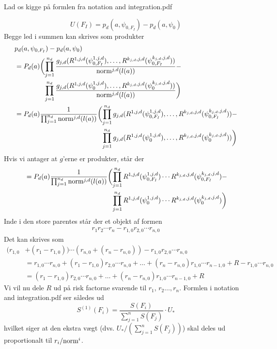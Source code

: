 \documentclass[a4paper, 12pt]{memoir}
\begin{document}
Lad os kigge på formlen fra notation and integration.pdf

\begin{equation}
U(F_I)=p_d(a,\psi_{0,F_I})-p_d(a, \psi_0)
\end{equation}
Begge led i summen kan skrives som produkter
\begin{align}
&p_d(a,\psi_{0,F_I})-p_d(a, \psi_0)\\
&=P_d(a) \biggl(\begin{lgathered}[t]\prod_{j=1}^{n_d} \frac{g_{j,d}(R^{1,j,d}(\psi_{0,F_I}^{1,j,d}),  \dots , R^{k_{j,d},j,d}(\psi_{0,F_I}^{k_{j,d},j,d}) )}{\textup{norm}^{j,d}(l(a))}-\\
 \prod_{j=1}^{n_d} \frac{g_{j,d}(R^{1,j,d}(\psi_{0}^{1,j,d}),  \dots , R^{k_{j,d},j,d}(\psi_{0}^{k_{j,d},j,d}) )}{\textup{norm}^{j,d}(l(a))}\biggr)\end{lgathered}\\
 &=P_d(a) \frac{1}{\prod_{j=1}^{n_d}{\textup{norm}^{j,d}(l(a))}}\biggl(\begin{lgathered}[t]\prod_{j=1}^{n_d} {g_{j,d}(R^{1,j,d}(\psi_{0,F_I}^{1,j,d}),  \dots , R^{k_{j,d},j,d}(\psi_{0,F_I}^{k_{j,d},j,d}) )}-\\
 \prod_{j=1}^{n_d} {g_{j,d}(R^{1,j,d}(\psi_{0}^{1,j,d}),  \dots , R^{k_{j,d},j,d}(\psi_{0}^{k_{j,d},j,d}) )}\biggr)\end{lgathered}\\
\end{align}
Hvis vi antager at $g$'erne er produkter, står der
\begin{align}
 &=P_d(a) \frac{1}{\prod_{j=1}^{n_d}{\textup{norm}^{j,d}(l(a))}}\biggl(\begin{lgathered}[t]\prod_{j=1}^{n_d} {R^{1,j,d}(\psi_{0,F_I}^{1,j,d})  \cdots R^{k_{j,d},j,d}(\psi_{0,F_I}^{k_{j,d},j,d}) }-\\
 \prod_{j=1}^{n_d} {R^{1,j,d}(\psi_{0}^{1,j,d}) \cdots R^{k_{j,d},j,d}(\psi_{0}^{k_{j,d},j,d}) }\biggr)\end{lgathered}\\
\end{align}
Inde i den store parentes står der et objekt af formen
\begin{align}
r_1r_2\cdots r_n- r_{1,0}r_{2,0}\cdots r_{n,0}
\end{align}
Det kan skrives som
\begin{align}
(r_{1,0}&+(r_1-r_{1,0}))\cdots (r_{n,0}+(r_n-r_{n,0}))- r_{1,0}r_{2,0}\cdots r_{n,0}\\
&=r_{1,0}\cdots r_{n,0}+(r_1-r_{1,0})r_{2,0}\cdots r_{n,0}+\dots + (r_n-r_{n,0})r_{1,0}\cdots r_{n-1,0}+ R -r_{1,0}\cdots r_{n,0}\\
&=(r_1-r_{1,0})r_{2,0}\cdots r_{n,0}+\dots + (r_n-r_{n,0})r_{1,0}\cdots r_{n-1,0}+ R
\end{align}
Vi vil nu dele $R$ ud på risk factorne svarende til $r_1$, $r_2 \dots , r_n$. Formlen i notation and integration.pdf ser således ud
\begin{equation}
S^{(1)}(F_i)=\frac{S(F_i)}{\sum_{j=1}^{n}S(F_j)}\cdot U_* \label{eqS1}
\end{equation}
hvilket siger at den ekstra vægt (dvs. $U_{*}/(\sum_{j=1}^{n}S(F_j))$) skal deles ud proportionalt til $r_i/\textup{norm}^{i}$. 
\end{document}
